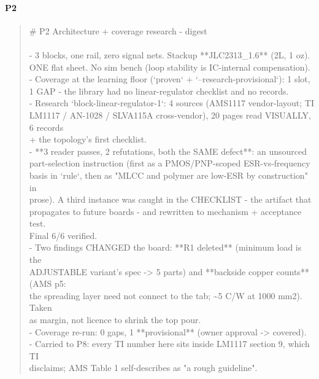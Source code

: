 \documentclass[11pt,a4paper]{article}
\begin{document}
\paragraph*{P2}
\begin{quote}\small\ttfamily\raggedright
\# P2 Architecture + coverage research - digest\\
~\\
- 3 blocks, one rail, zero signal nets. Stackup {*}{*}JLC2313\_1.6{*}{*} (2L, 1 oz).\\
  ONE flat sheet. No sim bench (loop stability is IC-internal compensation).\\
- Coverage at the learning floor (`proven` + `--research-provisional`): 1 slot,\\
  1 GAP - the library had no linear-regulator checklist and no records.\\
- Research `block-linear-regulator-1`: 4 sources (AMS1117 vendor-layout; TI\\
  LM1117 / AN-1028 / SLVA115A cross-vendor), 20 pages read VISUALLY, 6 records\\
  + the topology's first checklist.\\
- {*}{*}3 reader passes, 2 refutations, both the SAME defect{*}{*}: an unsourced\\
  part-selection instruction (first as a PMOS/PNP-scoped ESR-vs-frequency\\
  basis in `rule`, then as "MLCC and polymer are low-ESR by construction" in\\
  prose). A third instance was caught in the CHECKLIST - the artifact that\\
  propagates to future boards - and rewritten to mechanism + acceptance test.\\
  Final 6/6 verified.\\
- Two findings CHANGED the board: {*}{*}R1 deleted{*}{*} (minimum load is the\\
  ADJUSTABLE variant's spec -\textgreater{} 5 parts) and {*}{*}backside copper counts{*}{*} (AMS p5:\\
  the spreading layer need not connect to the tab; \textasciitilde{}5 C/W at 1000 mm2). Taken\\
  as margin, not licence to shrink the top pour.\\
- Coverage re-run: 0 gaps, 1 {*}{*}provisional{*}{*} (owner approval -\textgreater{} covered).\\
- Carried to P8: every TI number here sits inside LM1117 section 9, which TI\\
  disclaims; AMS Table 1 self-describes as "a rough guideline".
\end{quote}
\end{document}
